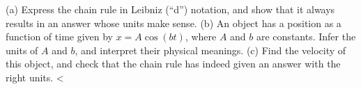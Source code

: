 (a) Express the chain rule in Leibniz (``d'') notation, and show that it always results in an answer whose
units make sense.\hwendpart
(b) An object has a  position as a function of time
given by $x=A\cos(bt)$, where $A$ and $b$ are constants.
Infer the units of $A$ and $b$, and interpret their physical meanings.\hwendpart
(c) Find the velocity of this object, and check that the chain rule has indeed given an answer with
the right units.\hwendpart
<%
